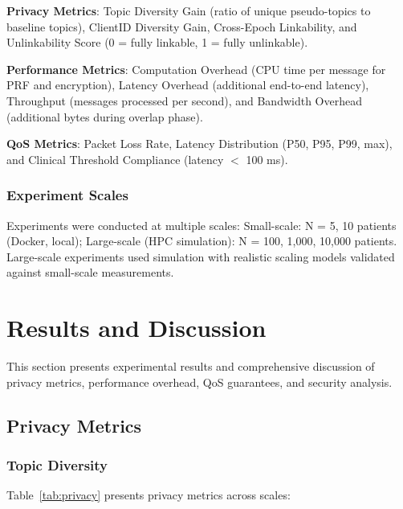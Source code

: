 \documentclass[conference]{IEEEtran}
\begin{document}
\textbf{Privacy Metrics}: Topic Diversity Gain (ratio of unique pseudo-topics to baseline topics), ClientID Diversity Gain, Cross-Epoch Linkability, and Unlinkability Score (0 = fully linkable, 1 = fully unlinkable).

\textbf{Performance Metrics}: Computation Overhead (CPU time per message for PRF and encryption), Latency Overhead (additional end-to-end latency), Throughput (messages processed per second), and Bandwidth Overhead (additional bytes during overlap phase).

\textbf{QoS Metrics}: Packet Loss Rate, Latency Distribution (P50, P95, P99, max), and Clinical Threshold Compliance (latency $<$ 100 ms).

\subsubsection{Experiment Scales}

Experiments were conducted at multiple scales: Small-scale: N = 5, 10 patients (Docker, local); Large-scale (HPC simulation): N = 100, 1,000, 10,000 patients. Large-scale experiments used simulation with realistic scaling models validated against small-scale measurements.

\section{Results and Discussion}

This section presents experimental results and comprehensive discussion of privacy metrics, performance overhead, QoS guarantees, and security analysis.

\subsection{Privacy Metrics}

\subsubsection{Topic Diversity}

Table~\ref{tab:privacy} presents privacy metrics across scales:
\end{document}
